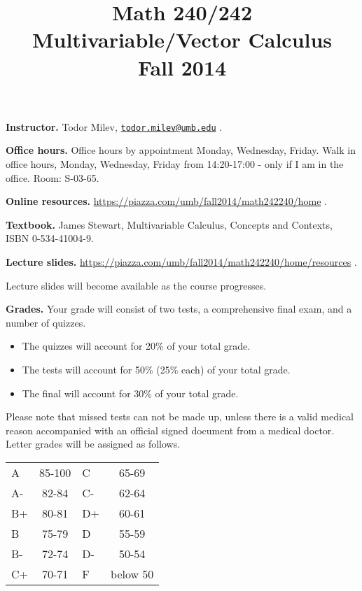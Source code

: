 \documentclass{article}
\title{Math 240/242 Multivariable/Vector Calculus \\ Fall 2014}
\date{}
\begin{document}
\maketitle

\noindent \textbf{Instructor.} Todor Milev, \href{mailto:todor.milev@umb.edu}{\nolinkurl{todor.milev@umb.edu}} \quad \quad \quad .

\medskip
\noindent \textbf{Office hours. } Office hours by appointment Monday, Wednesday, Friday. Walk in office hours, Monday, Wednesday, Friday from 14:20-17:00 - only if I am in the office. Room: S-03-65.

\medskip
\noindent \textbf{Online resources. }  \url{https://piazza.com/umb/fall2014/math242240/home}  \quad \quad \quad .


\medskip\noindent \textbf{Textbook. }  James Stewart, Multivariable Calculus, Concepts and Contexts, ISBN 0-534-41004-9.

\medskip \noindent \textbf{Lecture slides. }  \url{https://piazza.com/umb/fall2014/math242240/home/resources} \quad \quad \quad .

\medskip\noindent Lecture slides will become available as the course progresses.



\medskip
\noindent \textbf{Grades.} Your grade will consist of two tests, a comprehensive final exam, and a number of quizzes. 
\begin{itemize}
\item The quizzes will account for 20\% of your total grade.
\item The tests will account for 50\% (25\% each) of your total grade.
\item The final will account for 30\% of your total grade.
\end{itemize}
Please note that missed tests can not be made up, unless there is a valid medical reason accompanied with an official signed document from a medical doctor. Letter grades will be assigned as follows. 

\begin{center}
\begin{tabular}{lc|lc}
A & 85-100 & C & 65-69 \\
A-& 82-84 & C- & 62-64 \\
B+& 80-81 & D+ & 60-61 \\
B & 75-79& D & 55-59\\
B-& 72-74& D- & 50-54\\
C+& 70-71& F & below 50\\
\end{tabular}

\end{center}
\end{document}
